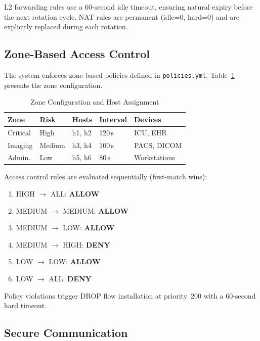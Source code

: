 \documentclass[conference]{IEEEtran}
\begin{document}
L2 forwarding rules use a 60-second idle timeout, ensuring natural expiry before the next rotation cycle. NAT rules are permanent (idle=0, hard=0) and are explicitly replaced during each rotation.

\subsection{Zone-Based Access Control}

The system enforces zone-based policies defined in \texttt{policies.yml}. Table~\ref{tab:zone_config} presents the zone configuration.

\begin{table}[htbp]
\caption{Zone Configuration and Host Assignment}
\label{tab:zone_config}
\centering
\footnotesize
\begin{tabular}{lllll}
\toprule
\textbf{Zone} & \textbf{Risk} & \textbf{Hosts} & \textbf{Interval} & \textbf{Devices} \\
\midrule
Critical & High & h1, h2 & 120\,s & ICU, EHR \\
Imaging & Medium & h3, h4 & 100\,s & PACS, DICOM \\
Admin. & Low & h5, h6 & 80\,s & Workstations \\
\bottomrule
\end{tabular}
\end{table}

Access control rules are evaluated sequentially (first-match wins):

\begin{enumerate}
    \item HIGH $\rightarrow$ ALL: \textbf{ALLOW}
    \item MEDIUM $\rightarrow$ MEDIUM: \textbf{ALLOW}
    \item MEDIUM $\rightarrow$ LOW: \textbf{ALLOW}
    \item MEDIUM $\rightarrow$ HIGH: \textbf{DENY}
    \item LOW $\rightarrow$ LOW: \textbf{ALLOW}
    \item LOW $\rightarrow$ ALL: \textbf{DENY}
\end{enumerate}

Policy violations trigger DROP flow installation at priority~200 with a 60-second hard timeout.

\subsection{Secure Communication}
\end{document}
